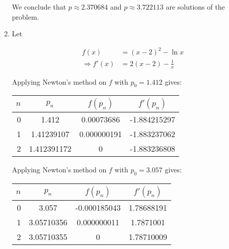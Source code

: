 \documentclass[../../../../Assignments]{subfiles}
\begin{document}
\begin{solution}
\begin{enumerate}[label = \alph*)]
            We conclude that \(p \approx \num{2.370684}\) and \(p \approx
            \num{3.722113}\) are solutions of the problem.

        \item Let

            \begin{align*}
                             f(x) &= (x - 2)^2 - \ln{x} \\
                \Rightarrow f'(x) &= 2(x - 2) - \frac{1}{x}
            \end{align*}

            Applying Newton's method on \(f\) with \(p_0 = \num{1.412}\) gives:

            \begin{table}[H]
                \centering
                \begin{tabular}{r S[table-format=1.9] S[table-format=1.9] S[table-format=-1.9]}
                    \toprule
                    \(n\)  &   {\(p_n\)}   &  {\(f(p_n)\)}  &  {\(f'(p_n)\)}  \\
                      &  1.412        &  0.00073686   &  -1.884215297    \\
                        1  &  1.41239107   &  0.000000191  &  -1.883237062    \\
                        2  &  1.412391172  &  0            &  -1.883236808    \\
                    \bottomrule
                \end{tabular}
            \end{table}

            Applying Newton's method on \(f\) with \(p_0 = \num{3.057}\) gives:

            \begin{table}[H]
                \centering
                \begin{tabular}{r S[table-format=1.9] S[table-format=-1.9] S[table-format=1.9]}
                    \toprule
                    \(n\)  &   {\(p_n\)}   &   {\(f(p_n)\)}  &  {\(f'(p_n)\)}  \\
                      &  3.057        &  -0.000185043   &  1.78688191     \\
                        1  &  3.05710356   &   0.000000011   &  1.7871001      \\
                        2  &  3.05710355   &   0             &  1.78710009     \\
                    \bottomrule
                \end{tabular}
            \end{table}


\end{enumerate}
\end{solution}
\end{document}
